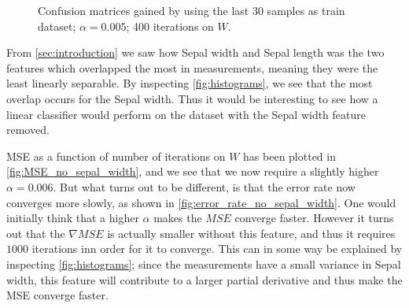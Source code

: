 \documentclass{article}
\begin{document}
\begin{figure}
    \centering
    \qquad
    \caption{Confusion matrices gained by using the last 30 samples as train dataset;%
    $\alpha = 0.005$; 400 iterations on $W$.}\label{fig:CM_30_last}
\end{figure}

From \autoref{sec:introduction} we saw how Sepal width and Sepal length was the two features which overlapped
the most in measurements, meaning they were the least linearly separable. By inspecting \autoref{fig:histograms},
we see that the most overlap occurs for the Sepal width. Thus it would be interesting to see how a linear classifier would
perform on the dataset with the Sepal width feature removed.

MSE as a function of number of iterations on $W$ has been plotted in \autoref{fig:MSE_no_sepal_width},
and we see that we now require a slightly higher $\alpha=0.006$. But what turns out to be different,
is that the error rate now converges more slowly, as shown in \autoref{fig:error_rate_no_sepal_width}.
One would initially think that a higher $\alpha$ makes the $MSE$ converge faster. However it turns
out that the $\nabla MSE$ is actually smaller without this feature, and thus it requires $1000$
iterations inn order for it to converge. This can in some way be explained by inspecting
\autoref{fig:histograms}; since the measurements have a small variance in Sepal width,
this feature will contribute to a larger partial derivative and thus make the MSE converge faster.
\end{document}

